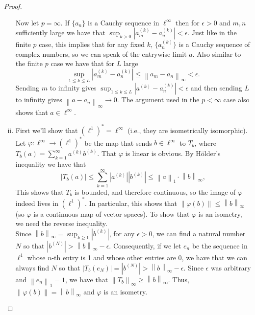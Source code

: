 \documentclass[11pt,letterpaper]{report}
\newcommand{\pnorm}[2]{\left\|{#1}\right\|_{{#2}}}
\begin{document}
\begin{proof}
\begin{enumerate}[(i)]
		Now let $p = \infty$. If $\{a_n\}$ is a Cauchy sequence in $\ell^\infty$ then for $\epsilon>0$ and $m,n$ sufficiently large we have that $\sup_{k>0}|a_m^{(k)} - a_n^{(k)}|<\epsilon$. Just like in the finite $p$ case, this implies that for any fixed $k$, $\{a_n^{(k)}\}$ is a Cauchy sequence of complex numbers, so we can speak of the entrywise limit $a$. Also similar to the finite $p$ case we have that for $L$ large
		\[
		\sup_{1\leq k\leq L}|a_m^{(k)}-a_n^{(k)}|\leq \pnorm{a_m-a_n}{\infty}<\epsilon.
		\]
		Sending $m$ to infinity gives $\sup_{1\leq k\leq L}|a^{(k)}-a_n^{(k)}|<\epsilon$ and then sending $L$ to infinity gives $\pnorm{a-a_n}{\infty}\to 0$. The argument used in the $p<\infty$ case also shows that $a\in \ell^\infty$.

		\item First we'll show that $(\ell^1)^* = \ell^\infty$ (i.e., they are isometrically isomorphic). 
		Let $\varphi: \ell^\infty\to (\ell^1)^*$ be the map that sends $b\in \ell^\infty$ to $T_b$, where $T_b(a) = \sum_{k=1}^\infty a^{(k)}b^{(k)}$. That $\varphi$ is linear is obvious. By H\"older's inequality we have that
		\[
		|T_b(a)| \leq \sum_{k=1}^\infty \left|a^{(k)}\right|\left|b^{(k)}\right| \leq \pnorm{a}{1}\cdot \pnorm{b}{\infty},
		\]
		This shows that $T_b$ is bounded, and therefore continuous, so the image of $\varphi$ indeed lives in $(\ell^1)^*$. In particular, this shows that $\|\varphi(b)\|\leq \pnorm{b}{\infty}$ (so $\varphi$ is a continuous map of vector spaces). To show that $\varphi$ is an isometry, we need the reverse inequality.\\
		Since $\pnorm{b}{\infty} = \sup_{k\geq 1}|b^{(k)}|$, for any $\epsilon>0$, we can find a natural number $N$ so that $|b^{(N)}|>\pnorm{b}{\infty}-\epsilon$. Consequently, if we let $e_n$ be the sequence in $\ell^1$ whose $n$-th entry is 1 and whose other entries are 0, we have that we can always find $N$ so that $|T_b(e_N)| = |b^{(N)}| >\pnorm{b}{\infty}-\epsilon$. Since $\epsilon$ was arbitrary and $\pnorm{e_n}{1} = 1$, we have that $\pnorm{T_b}{\infty} \geq \pnorm{b}{\infty}$. Thus, $\|\varphi(b)\| = \pnorm{b}{\infty}$ and $\varphi$ is an isometry.\\

\end{enumerate}
\end{proof}
\end{document}
